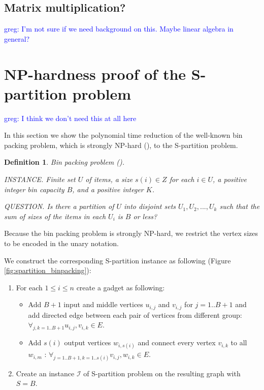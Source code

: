 \documentclass[sigconf]{acmart}
\newcommand\greg[1]{\textcolor{blue}{greg: #1}}
\newtheorem{mydef}{Definition}
\begin{document}
\subsection{Matrix multiplication?}
\greg{I'm not sure if we need background on this. Maybe linear algebra in 
general?}	

\section{NP-hardness proof of the S-partition problem}
\label{sec:np-hard}

\greg{I think we don't need this at all here}

In this section we show the polynomial time reduction of the well-known bin 
packing problem, which is strongly NP-hard
(\cite{computersIntractability}), to the S-partition problem.

\begin{mydef}
	Bin packing problem (\cite{computersIntractability}). 
	
	INSTANCE. Finite set $U$ of items, a size $s(i) \in Z$ for each $i \in U$, 
	a positive integer bin capacity $B$, and a positive integer $K$.
	
	QUESTION. Is there a partition of $U$ into disjoint sets $U_1, U_2, ..., 
	U_k$ such that the sum of sizes of the items in each $U_i$ is $B$ or less?
\end{mydef}

Because the bin packing problem is strongly NP-hard, we restrict the vertex 
sizes to be encoded in the unary notation.

We construct the corresponding S-partition instance as following (Figure 
\ref{fig:spartition_binpacking}):
\begin{enumerate}
	\item For each $1 \le i \le n$ create a gadget as following:
	\begin{itemize}
		\item Add $B+1$ input and middle vertices $u_{i, j}$ and $v_{i, j}$ for 
		$j = 1..B+1$ 
		and add directed edge between each pair of vertices from different 
		group: $\forall_{j,k = 
		1..B+1}u_{i,j},v_{i,k} \in E$.
		\item Add $s(i)$ output vertices $w_{i, s(i)}$ and connect every vertex 
		$v_{i,k}$ to all $w_{i,m}$ : $\forall_{j = 
			1..B+1, k = 1..s(i)}v_{i,j},w_{i,k} \in E$.
	\end{itemize}
	\item Create an instance $\mathcal{I}$ of S-partition problem on the 
	resulting graph 
	with $S = B$.
\end{enumerate}
\end{document}
